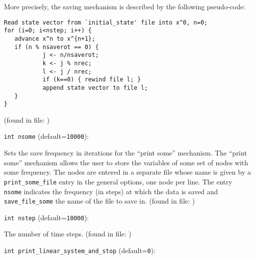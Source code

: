 More precisely, the saving mechanism is described by the following
pseudo-code:

\begin{verbatim}
Read state vector from `initial_state' file into x^0, n=0;
for (i=0; i<nstep; i++) {
   advance x^n to x^{n+1};
   if (n % nsaverot == 0) {
           j <- n/nsaverot;
           k <- j % nrec;
           l <- j / nrec;
           if (k==0) { rewind file l; }
           append state vector to file l;
   }
}
\end{verbatim}
 (found in file: \verb++)
\item\verb+int nsome+ {\rm(default=\verb|10000|)}:

Sets the save frequency in iterations for the ``print some''
mechanism. 
\label{sec:print_some}
The ``print some'' mechanism allows the user to store the variables of
some set of nodes with some frequency. The nodes are entered in a
separate file whose name is given by a \verb+print_some_file+ entry in
the general options, one node per line. The entry \verb+nsome+
indicates the frequency (in steps) at which the data is saved and
\verb+save_file_some+ the name of the file to save in. 
 (found in file: \verb++)
\item\verb+int nstep+ {\rm(default=\verb|10000|)}:

The number of time steps. 
 (found in file: \verb++)
\item\verb+int print_linear_system_and_stop+ {\rm(default=\verb|0|)}:

